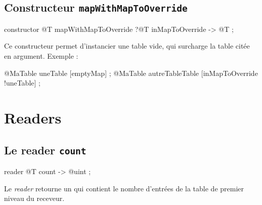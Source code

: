  

\subsection{Constructeur \texttt{mapWithMapToOverride}}

\begin{galgascode}
constructor @T mapWithMapToOverride ?@T inMapToOverride -> @T ;
\end{galgascode}

Ce constructeur permet d'instancier une table vide, qui surcharge la table  citée en argument. Exemple :
\begin{galgascode}
@MaTable uneTable [emptyMap] ;
@MaTable autreTableTable [inMapToOverride !uneTable] ;
\end{galgascode}

\section{Readers}

%
%

\subsection{Le reader \texttt{count}}

\begin{galgascode}
reader @T count -> @uint ;
\end{galgascode}


Le \emph{reader}  retourne un  qui contient le nombre d'entrées de la table de premier niveau du receveur.



